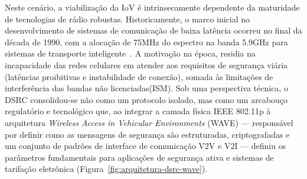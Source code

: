 Neste cenário, a viabilização da \gls{IoV} é intrinsecamente dependente da maturidade de tecnologias de rádio robustas. Historicamente, o marco inicial no desenvolvimento de sistemas de comunicação de baixa latência ocorreu no final da década de 1990, com a alocação de 75MHz do espectro na banda 5.9GHz para sistemas de transporte inteligente~\cite{zheng2015}. A motivação na época, residia na incapacidade das redes celulares em atender aos requisitos de segurança viária (latências proibitivas e instabilidade de conexão), somada às limitações de interferência das bandas não licenciadas(\gls{ISM}). Sob uma perspectiva técnica, o \gls{DSRC} consolidou-se não como um protocolo isolado, mas como um arcabouço regulatório e tecnológico que, ao integrar a camada física IEEE 802.11p à arquitetura \textit{Wireless Access in Vehicular Environments} (WAVE) --- responsável por definir como as mensagens de segurança são estruturadas, criptografadas e um conjunto de padrões de interface de comunicação \gls{V2V} e \gls{V2I} --- definiu os parâmetros fundamentais para aplicações de segurança ativa e sistemas de tarifação eletrônica (Figura~\ref{fig:arquitetura-dsrc-wave}).

